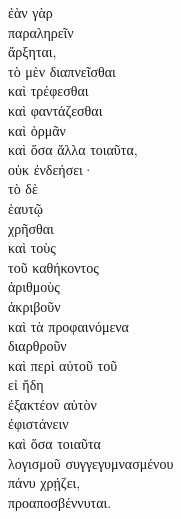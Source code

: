 
{\large
\begin{greek}
\noindent ἐὰν γὰρ \\
\tabto{2em} παραληρεῖν \\
\tabto{4em} ἄρξηται, \\
τὸ μὲν διαπνεῖσθαι \\
καὶ τρέφεσθαι \\
καὶ φαντάζεσθαι \\
καὶ ὁρμᾶν \\
καὶ ὅσα ἄλλα τοιαῦτα, \\
\tabto{2em} οὐκ ἐνδεήσει·\\
τὸ δὲ \\
\tabto{2em} ἑαυτῷ \\
\tabto{4em} χρῆσθαι \\
καὶ τοὺς \\
\tabto{2em} τοῦ καθήκοντος \\
ἀριθμοὺς \\
\tabto{2em} ἀκριβοῦν \\
καὶ τὰ προφαινόμενα \\
\tabto{2em} διαρθροῦν \\
καὶ περὶ αὐτοῦ τοῦ \\
\tabto{2em} εἰ ἤδη \\
\tabto{4em} ἐξακτέον αὑτὸν \\
ἐφιστάνειν \\
καὶ ὅσα τοιαῦτα \\
\tabto{2em} λογισμοῦ συγγεγυμνασμένου \\
\tabto{4em} πάνυ χρῄζει, \\
προαποσβέννυται.\\

\end{greek}
}

